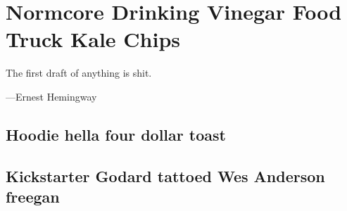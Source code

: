 \chapter{Normcore Drinking Vinegar Food Truck Kale Chips}\label{chapter:theory}

\epigraph{The first draft of anything is shit.}{%
    ---Ernest Hemingway}

\noindent \kant[133-125]

\kant[126-128]

\section{Hoodie hella four dollar toast}

\kant[148-152]

\section{Kickstarter Godard tattoed Wes Anderson freegan}

\kant[44-47]
